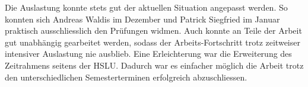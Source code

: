 \begin{itemize}
    Die Auslastung konnte stets gut der aktuellen Situation angepasst werden. So konnten sich Andreas Waldis im Dezember und Patrick Siegfried im Januar praktisch ausschliesslich den Prüfungen widmen. Auch konnte an Teile der Arbeit gut unabhängig gearbeitet werden, sodass der Arbeits-Fortschritt trotz zeitweiser intensiver Auslastung nie ausblieb. Eine Erleichterung war die Erweiterung des Zeitrahmens seitens der HSLU. Dadurch war es einfacher möglich die Arbeit trotz den unterschiedlichen Semesterterminen erfolgreich abzuschliessen.
\end{itemize}

